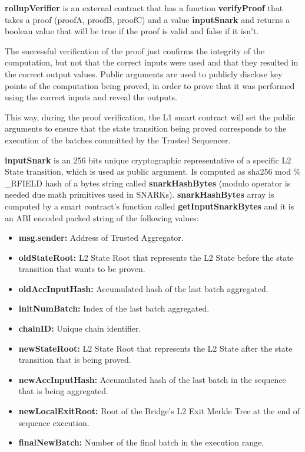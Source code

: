 \textbf{rollupVerifier} is an external contract that has a function \textbf{verifyProof} that takes a proof (proofA, proofB, proofC) and a value \textbf{inputSnark} and returns a boolean value that will be true if the proof is valid and false if it isn't. 

The successful verification of the proof just confirms the integrity of the computation, but not that the correct inputs were used and that they resulted in the correct output values. Public arguments are used to publicly disclose key points of the computation being proved, in order to prove that it was performed using the correct inputs and reveal the outputs. 

This way, during the proof verification, the L1 smart contract will set the public arguments to ensure that the state transition being proved corresponds to the execution of the batches committed by the Trusted Sequencer.

\textbf{inputSnark} is an 256 bits unique cryptographic representative of a specific L2 State transition, which is used as public argument. Is computed as sha256 mod \% \_RFIELD  hash of a bytes string called \textbf{snarkHashBytes} (modulo operator is needed due math primitives used in SNARKs). \textbf{snarkHashBytes} array is computed by a smart contract’s function called \textbf{getInputSnarkBytes} and it is an ABI encoded packed string of the following values:
\begin{itemize}
	\item \textbf{msg.sender:} Address of Trusted Aggregator.
	\item \textbf{oldStateRoot:} L2 State Root that represents the L2 State before the state transition that wants to be proven.
	\item \textbf{oldAccInputHash:} Accumulated hash of the last batch aggregated.
	\item \textbf{initNumBatch:} Index of the last batch aggregated.
	\item \textbf{chainID:} Unique chain identifier.
	\item \textbf{newStateRoot:} L2 State Root that represents the L2 State after the state transition that is being proved.
	\item \textbf{newAccInputHash:} Accumulated hash of the last batch in the sequence that is being aggregated.
	\item \textbf{newLocalExitRoot:} Root of the Bridge's L2 Exit Merkle Tree at the end of sequence execution.
	\item \textbf{finalNewBatch:} Number of the final batch in the execution range.
\end{itemize}

